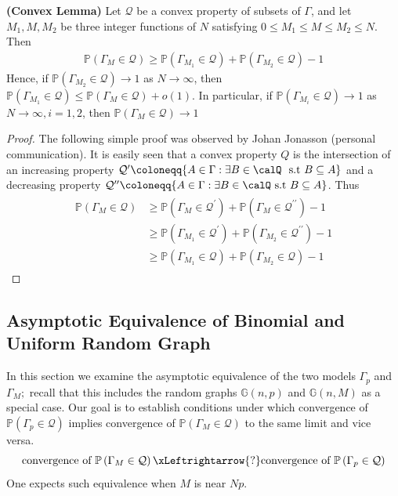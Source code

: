 \documentclass{article}
\newcommand{\bfs}[1]{\textbf{({#1}) }}
\begin{document}
\begin{lema}{\bfs{Convex Lemma}}\label{lemconvex}
Let $\mathcal{Q}$ be a convex property of subsets of $\Gamma$, and let $M_{1}, M, M_{2}$ be three integer functions of $N$ satisfying $0 \leq M_{1} \leq M \leq M_{2} \leq N .$ Then
\begin{align*}
\mathbb{P}\left(\Gamma_{M} \in \mathcal{Q}\right) \geq \mathbb{P}\left(\Gamma_{M_{1}} \in \mathcal{Q}\right)+\mathbb{P}\left(\Gamma_{M_{2}} \in \mathcal{Q}\right)-1
\end{align*}
Hence, if $\mathbb{P}\left(\Gamma_{M_{2}} \in \mathcal{Q}\right) \rightarrow 1$ as $N \rightarrow \infty$, then $\mathbb{P}\left(\Gamma_{M_{1}} \in \mathcal{Q}\right) \leq \mathbb{P}\left(\Gamma_{M} \in \mathcal{Q}\right)+o(1)$.
In particular, if $\mathbb{P}\left(\Gamma_{M_{i}} \in \mathcal{Q}\right) \rightarrow 1$ as $N \rightarrow \infty, i=1,2$, then $\mathbb{P}\left(\Gamma_{M} \in \mathcal{Q}\right) \rightarrow 1$
\end{lema}

\begin{proof}
The following simple proof was observed by Johan Jonasson (personal communication). It is easily seen that a convex property $Q$ is the intersection of an increasing property $\mathcal{Q}^{\prime}\coloneqq \{A\in \Gamma:\exists B \in \calQ\ \text{ s.t } B\subseteq A\}$ and a decreasing property $\mathcal{Q}^{\prime \prime}\coloneqq \{A\in \Gamma:\exists B \in \calQ \text{ s.t } B\subseteq A\}$. Thus
\begin{align*}
\begin{aligned}
\mathbb{P}\left(\Gamma_{M} \in \mathcal{Q}\right) & \geq \mathbb{P}\left(\Gamma_{M} \in \mathcal{Q}^{\prime}\right)+\mathbb{P}\left(\Gamma_{M} \in \mathcal{Q}^{\prime \prime}\right)-1 \\
& \geq \mathbb{P}\left(\Gamma_{M_{1}} \in \mathcal{Q}^{\prime}\right)+\mathbb{P}\left(\Gamma_{M_{2}} \in \mathcal{Q}^{\prime \prime}\right)-1 \\
& \geq \mathbb{P}\left(\Gamma_{M_{1}} \in \mathcal{Q}\right)+\mathbb{P}\left(\Gamma_{M_{2}} \in \mathcal{Q}\right)-1
\end{aligned}
\end{align*}
\end{proof}
\subsection{Asymptotic Equivalence of Binomial and Uniform Random Graph}\label{ssec:aym}
In this section we examine the asymptotic equivalence of the two models $\Gamma_{p}$ and $\Gamma_{M} ;$ recall that this includes the random graphs $\mathbb{G}(n, p)$ and $\mathbb{G}(n, M)$ as a special case. Our goal is to establish conditions under which convergence of $\mathbb{P}\left(\Gamma_{p} \in \mathcal{Q}\right)$ implies convergence of $\mathbb{P}\left(\Gamma_{M} \in \mathcal{Q}\right)$ to the same limit and vice versa. 
$$\text{convergence of }\mathbb{P}\left(\Gamma_{M} \in \mathcal{Q}\right)\xLeftrightarrow{?}\text{convergence of } \mathbb{P}\left(\Gamma_{p} \in \mathcal{Q}\right)$$
One expects such equivalence when $M$ is near $N p$. 
\end{document}
